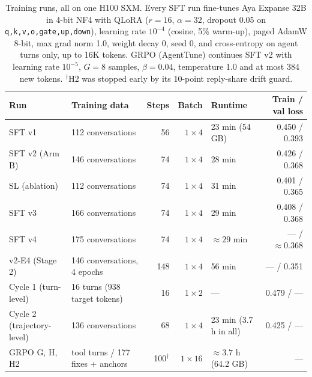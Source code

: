 \documentclass[11pt]{article}
\begin{document}
\begin{table}[t]
\centering
\footnotesize
\setlength{\tabcolsep}{4.5pt}
\begin{tabular}{llrrlr}
\toprule
\textbf{Run} & \textbf{Training data} & \textbf{Steps} & \textbf{Batch} & \textbf{Runtime} & \textbf{Train / val loss} \\
\midrule
SFT v1 & 112 conversations & 56 & $1 \times 4$ & 23 min (54 GB) & 0.450 / 0.393 \\
SFT v2 (Arm B) & 146 conversations & 74 & $1 \times 4$ & 28 min & 0.426 / 0.368 \\
SL (ablation) & 112 conversations & 74 & $1 \times 4$ & 31 min & 0.401 / 0.365 \\
SFT v3 & 166 conversations & 74 & $1 \times 4$ & 29 min & 0.408 / 0.368 \\
SFT v4 & 175 conversations & 74 & $1 \times 4$ & $\approx 29$ min & --- / $\approx 0.368$ \\
v2-E4 (Stage 2) & 146 conversations, 4 epochs & 148 & $1 \times 4$ & 56 min & --- / 0.351 \\
Cycle 1 (turn-level) & 16 turns (938 target tokens) & 16 & $1 \times 2$ & --- & 0.479 / --- \\
Cycle 2 (trajectory-level) & 136 conversations & 68 & $1 \times 4$ & 23 min (3.7 h in all) & 0.425 / --- \\
\midrule
GRPO G, H, H2 & tool turns / 177 fixes + anchors & 100$^\dagger$ & $1 \times 16$ & $\approx 3.7$ h (64.2 GB) & --- \\
\bottomrule
\end{tabular}
\caption{Training runs, all on one H100 SXM. Every SFT run fine-tunes Aya Expanse 32B in 4-bit NF4 with QLoRA ($r=16$, $\alpha=32$, dropout 0.05 on \texttt{q,k,v,o,gate,up,down}), learning rate $10^{-4}$ (cosine, 5\% warm-up), paged AdamW 8-bit, max grad norm 1.0, weight decay 0, seed 0, and cross-entropy on agent turns only, up to 16K tokens. GRPO (AgentTune) continues SFT v2 with learning rate $10^{-5}$, $G=8$ samples, $\beta=0.04$, temperature 1.0 and at most 384 new tokens. $^\dagger$H2 was stopped early by its 10-point reply-share drift guard.}
\label{tab:hyperparams}
\end{table}
\end{document}

